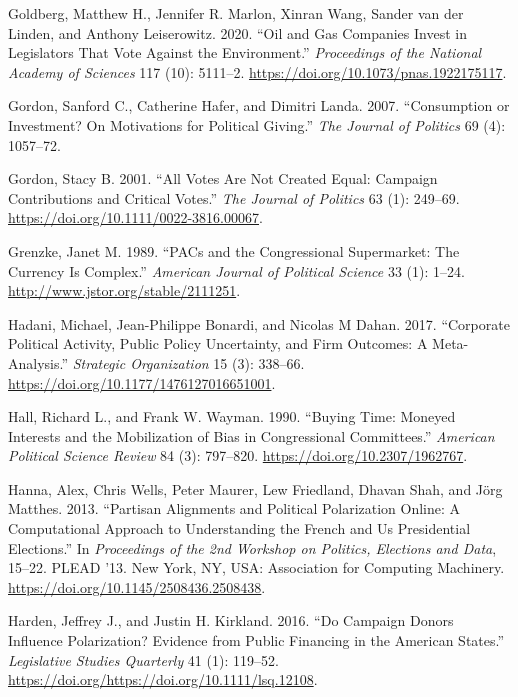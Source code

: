 \documentclass[12pt,]{article}
\begin{document}
\leavevmode\hypertarget{ref-goldberg2020}{}%
Goldberg, Matthew H., Jennifer R. Marlon, Xinran Wang, Sander van der
Linden, and Anthony Leiserowitz. 2020. ``Oil and Gas Companies Invest in
Legislators That Vote Against the Environment.'' \emph{Proceedings of
the National Academy of Sciences} 117 (10): 5111--2.
\url{https://doi.org/10.1073/pnas.1922175117}.

\leavevmode\hypertarget{ref-gordon2007}{}%
Gordon, Sanford C., Catherine Hafer, and Dimitri Landa. 2007.
``Consumption or Investment? On Motivations for Political Giving.''
\emph{The Journal of Politics} 69 (4): 1057--72.

\leavevmode\hypertarget{ref-gordon2001}{}%
Gordon, Stacy B. 2001. ``All Votes Are Not Created Equal: Campaign
Contributions and Critical Votes.'' \emph{The Journal of Politics} 63
(1): 249--69. \url{https://doi.org/10.1111/0022-3816.00067}.

\leavevmode\hypertarget{ref-grenzke1989}{}%
Grenzke, Janet M. 1989. ``PACs and the Congressional Supermarket: The
Currency Is Complex.'' \emph{American Journal of Political Science} 33
(1): 1--24. \url{http://www.jstor.org/stable/2111251}.

\leavevmode\hypertarget{ref-hadani2017}{}%
Hadani, Michael, Jean-Philippe Bonardi, and Nicolas M Dahan. 2017.
``Corporate Political Activity, Public Policy Uncertainty, and Firm
Outcomes: A Meta-Analysis.'' \emph{Strategic Organization} 15 (3):
338--66. \url{https://doi.org/10.1177/1476127016651001}.

\leavevmode\hypertarget{ref-hall1990}{}%
Hall, Richard L., and Frank W. Wayman. 1990. ``Buying Time: Moneyed
Interests and the Mobilization of Bias in Congressional Committees.''
\emph{American Political Science Review} 84 (3): 797--820.
\url{https://doi.org/10.2307/1962767}.

\leavevmode\hypertarget{ref-hanna2013}{}%
Hanna, Alex, Chris Wells, Peter Maurer, Lew Friedland, Dhavan Shah, and
Jörg Matthes. 2013. ``Partisan Alignments and Political Polarization
Online: A Computational Approach to Understanding the French and Us
Presidential Elections.'' In \emph{Proceedings of the 2nd Workshop on
Politics, Elections and Data}, 15--22. PLEAD '13. New York, NY, USA:
Association for Computing Machinery.
\url{https://doi.org/10.1145/2508436.2508438}.

\leavevmode\hypertarget{ref-harden2016}{}%
Harden, Jeffrey J., and Justin H. Kirkland. 2016. ``Do Campaign Donors
Influence Polarization? Evidence from Public Financing in the American
States.'' \emph{Legislative Studies Quarterly} 41 (1): 119--52.
\url{https://doi.org/https://doi.org/10.1111/lsq.12108}.
\end{document}
